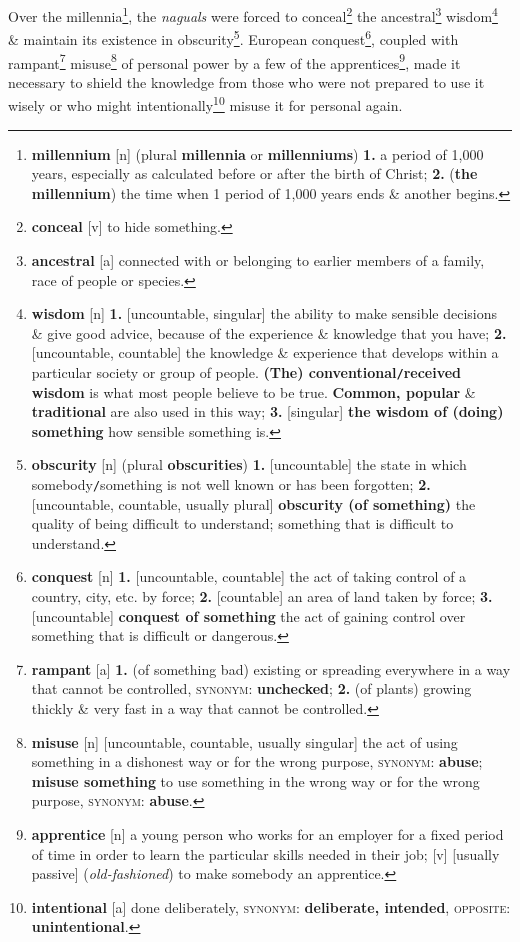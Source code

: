 \documentclass[oneside]{book}
\numberwithin{equation}{section}
\begin{document}
Over the millennia\footnote{\textbf{millennium} [n] (plural \textbf{millennia} or \textbf{millenniums}) \textbf{1.} a period of 1,000 years, especially as calculated before or after the birth of Christ; \textbf{2.} (\textbf{the millennium}) the time when 1 period of 1,000 years ends \& another begins.}, the \textit{naguals} were forced to conceal\footnote{\textbf{conceal} [v] to hide something.} the ancestral\footnote{\textbf{ancestral} [a] connected with or belonging to earlier members of a family, race of people or species.} wisdom\footnote{\textbf{wisdom} [n] \textbf{1.} [uncountable, singular] the ability to make sensible decisions \& give good advice, because of the experience \& knowledge that you have; \textbf{2.} [uncountable, countable] the knowledge \& experience that develops within a particular society or group of people. \textbf{(The) conventional\texttt{/}received wisdom} is what most people believe to be true. \textbf{Common, popular} \& \textbf{traditional} are also used in this way; \textbf{3.} [singular] \textbf{the wisdom of (doing) something} how sensible something is.} \& maintain its existence in obscurity\footnote{\textbf{obscurity} [n] (plural \textbf{obscurities}) \textbf{1.} [uncountable] the state in which somebody\texttt{/}something is not well known or has been forgotten; \textbf{2.} [uncountable, countable, usually plural] \textbf{obscurity (of something)} the quality of being difficult to understand; something that is difficult to understand.}. European conquest\footnote{\textbf{conquest} [n] \textbf{1.} [uncountable, countable] the act of taking control of a country, city, etc. by force; \textbf{2.} [countable] an area of land taken by force; \textbf{3.} [uncountable] \textbf{conquest of something} the act of gaining control over something that is difficult or dangerous.}, coupled with rampant\footnote{\textbf{rampant} [a] \textbf{1.} (of something bad) existing or spreading everywhere in a way that cannot be controlled, \textsc{synonym}: \textbf{unchecked}; \textbf{2.} (of plants) growing thickly \& very fast in a way that cannot be controlled.} misuse\footnote{\textbf{misuse} [n] [uncountable, countable, usually singular] the act of using something in a dishonest way or for the wrong purpose, \textsc{synonym}: \textbf{abuse}; \textbf{misuse something} to use something in the wrong way or for the wrong purpose, \textsc{synonym}: \textbf{abuse}.} of personal power by a few of the apprentices\footnote{\textbf{apprentice} [n] a young person who works for an employer for a fixed period of time in order to learn the particular skills needed in their job; [v] [usually passive] (\textit{old-fashioned}) to make somebody an apprentice.}, made it necessary to shield the knowledge from those who were not prepared to use it wisely or who might intentionally\footnote{\textbf{intentional} [a] done deliberately, \textsc{synonym}: \textbf{deliberate, intended}, \textsc{opposite}: \textbf{unintentional}.} misuse it for personal again.
\end{document}
